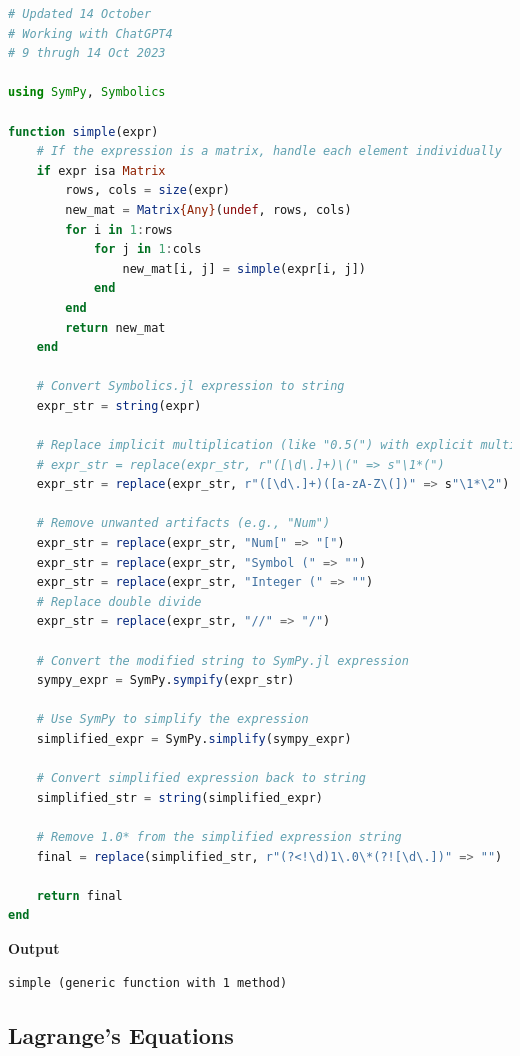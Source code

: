 \bigskip
\begin{lstlisting}[language=Julia,style=mystyle]
# Updated 14 October
# Working with ChatGPT4 
# 9 thrugh 14 Oct 2023

using SymPy, Symbolics

function simple(expr)
    # If the expression is a matrix, handle each element individually
    if expr isa Matrix
        rows, cols = size(expr)
        new_mat = Matrix{Any}(undef, rows, cols)
        for i in 1:rows
            for j in 1:cols
                new_mat[i, j] = simple(expr[i, j])
            end
        end
        return new_mat
    end

    # Convert Symbolics.jl expression to string
    expr_str = string(expr)

    # Replace implicit multiplication (like "0.5(") with explicit multiplication ("0.5*(")
    # expr_str = replace(expr_str, r"([\d\.]+)\(" => s"\1*(")
    expr_str = replace(expr_str, r"([\d\.]+)([a-zA-Z\(])" => s"\1*\2")
    
    # Remove unwanted artifacts (e.g., "Num")
    expr_str = replace(expr_str, "Num[" => "[")
    expr_str = replace(expr_str, "Symbol (" => "")
    expr_str = replace(expr_str, "Integer (" => "")
    # Replace double divide
    expr_str = replace(expr_str, "//" => "/")

    # Convert the modified string to SymPy.jl expression
    sympy_expr = SymPy.sympify(expr_str)

    # Use SymPy to simplify the expression
    simplified_expr = SymPy.simplify(sympy_expr)

    # Convert simplified expression back to string
    simplified_str = string(simplified_expr)

    # Remove 1.0* from the simplified expression string
    final = replace(simplified_str, r"(?<!\d)1\.0\*(?![\d\.])" => "")

    return final
end

\end{lstlisting}
\textbf{Output} 
\begin{verbatim}
simple (generic function with 1 method)
\end{verbatim}
\bigskip



\subsection{Lagrange's Equations}

